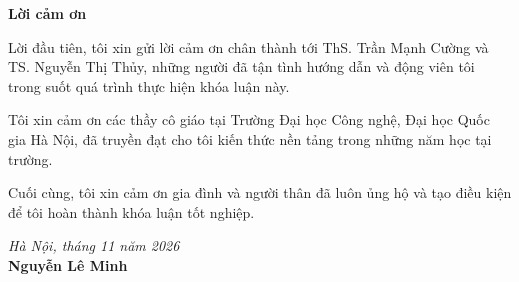 \begin{center}
\textbf{\large{Lời cảm ơn}}
\end{center}

Lời đầu tiên, tôi xin gửi lời cảm ơn chân thành tới ThS. Trần Mạnh Cường và TS. Nguyễn Thị Thủy, những người đã tận tình hướng dẫn và động viên tôi trong suốt quá trình thực hiện khóa luận này.

Tôi xin cảm ơn các thầy cô giáo tại Trường Đại học Công nghệ, Đại học Quốc gia Hà Nội, đã truyền đạt cho tôi kiến thức nền tảng trong những năm học tại trường.

Cuối cùng, tôi xin cảm ơn gia đình và người thân đã luôn ủng hộ và tạo điều kiện để tôi hoàn thành khóa luận tốt nghiệp.

\vspace{1.5cm}
\begin{flushright}
\textit{Hà Nội, tháng 11 năm 2026}\\[0.3cm]
\textbf{Nguyễn Lê Minh}
\end{flushright}
